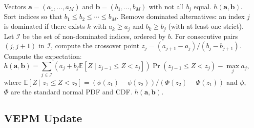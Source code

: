 \documentclass[12pt]{article}
\theoremstyle{plain}
\theoremstyle{definition}
\theoremstyle{remark}
\begin{document}
\begin{algorithm}[ht]
\caption{Compute $h(\mathbf{a}, \mathbf{b})$ (adapted from \citet{Frazier2009})}\label{alg:h_function}
\begin{algorithmic}[1]
\Require Vectors $\mathbf{a} = (a_1, \ldots, a_M)$ and $\mathbf{b} = (b_1, \ldots, b_M)$ with not all $b_j$ equal.
\Ensure $h(\mathbf{a}, \mathbf{b})$.
\State Sort indices so that $b_1 \leq b_2 \leq \cdots \leq b_M$.
\State Remove dominated alternatives: an index $j$ is dominated if there
  exists $k$ with $a_k \geq a_j$ and $b_k \geq b_j$ (with at least one strict).
  Let $\mathcal{I}$ be the set of non-dominated indices, ordered by $b$.
\State For consecutive pairs $(j, j+1)$ in $\mathcal{I}$, compute the
  crossover point $z_j = (a_{j+1} - a_j)/(b_j - b_{j+1})$.
\State Compute the expectation:
\[
  h(\mathbf{a}, \mathbf{b})
  = \sum_{j \in \mathcal{I}} (a_j + b_j \mathbb{E}[Z \mid z_{j-1} \leq Z < z_j])
    \Pr(z_{j-1} \leq Z < z_j) - \max_j a_j,
\]
where $\mathbb{E}[Z \mid z_1 \leq Z < z_2] = (\phi(z_1) - \phi(z_2))/(\Phi(z_2) - \Phi(z_1))$
and $\phi$, $\Phi$ are the standard normal PDF and CDF.
\State \Return $h(\mathbf{a}, \mathbf{b})$.
\end{algorithmic}
\end{algorithm}

\subsection{VEPM Update}\label{app:vepm_update}
\end{document}
